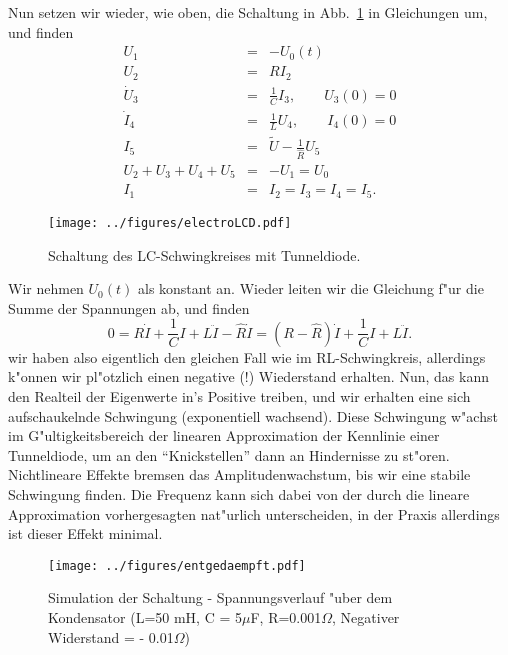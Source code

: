 {Nun setzen wir wieder, wie oben, die Schaltung in Abb.~\ref{tunnelschwing} in Gleichungen um, und finden
\begin{eqnarray*}
U_1 & = & - U_0(t)\\
U_2 & = & R I_2\\
\dot U_3 & = & \frac 1 C I_3,\qquad U_3(0) = 0\\
 \dot I_4 & = & \frac 1 L U_4,\qquad I_4(0) = 0\\
I_5 & = & \tilde U-\frac 1 {\hat R} U_5\\
U_2+U_3+U_4+ U_5 & = & -U_1 = U_0\\
I_1 & = & I_2 = I_3 = I_4 = I_5.
\end{eqnarray*}

\begin{figure}[htbp] %
   \centering
   \texttt{[image: ../figures/electroLCD.pdf]} 
   \caption{Schaltung des LC-Schwingkreises mit Tunneldiode.
   }
   \label{tunnelschwing}
\end{figure}


Wir nehmen $U_0(t)$ als konstant an. Wieder leiten wir die Gleichung f"ur die Summe der Spannungen
ab, und finden
$$ 
0 = 
R \dot I 
+ \frac 1 C I + L \ddot I - \hat R \dot I
=
(R-\hat R)  \dot I + \frac 1 C I + L \ddot I 
.$$
wir haben also eigentlich den gleichen Fall wie im RL-Schwingkreis, allerdings k"onnen wir pl"otzlich einen
negative (!) Wiederstand erhalten. Nun, das kann den Realteil der Eigenwerte in's Positive treiben, und wir erhalten
eine sich aufschaukelnde Schwingung (exponentiell wachsend). Diese Schwingung w"achst im G"ultigkeitsbereich
der linearen Approximation der Kennlinie einer Tunneldiode, um an den ``Knickstellen'' dann an Hindernisse zu st"oren. Nichtlineare Effekte bremsen das Amplitudenwachstum, bis wir eine stabile Schwingung finden. Die Frequenz kann sich dabei von der durch die lineare Approximation vorhergesagten nat"urlich unterscheiden, in der
Praxis allerdings ist dieser Effekt minimal.\par


\begin{figure}[htbp] %
   \centering
   \texttt{[image: ../figures/entgedaempft.pdf]} 
   \caption{Simulation der Schaltung - Spannungsverlauf "uber dem Kondensator  
   (L=50 mH, C = 5$\mu$F, R=0.001$\Omega$, Negativer Widerstand = - 0.01$\Omega$)
   }
   \label{ele3}
\end{figure}


}
